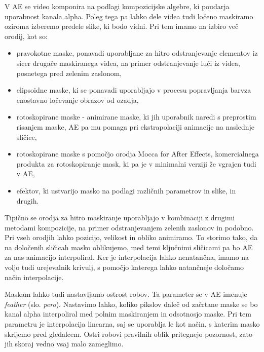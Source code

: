 \documentclass[a4paper, 12pt]{book}
\begin{document}
V AE se video komponira na podlagi kompozicijske algebre, ki poudarja uporabnost kanala alpha.
Poleg tega pa lahko dele videa tudi ločeno maskiramo oziroma izberemo predele slike, ki bodo vidni.
Pri tem imamo na izbiro več orodij, kot so:
\begin{itemize}
\item{pravokotne maske, ponavadi uporabljane za hitro odstranjevanje elementov iz sicer drugače maskiranega videa, na primer odstranjevanje luči iz videa, posnetega pred zelenim zaslonom,}
\item{elipsoidne maske, ki se ponavadi uporabljajo v procesu popravljanja barv\footnotemark za enostavno ločevanje obrazov od ozadja,}
\item{rotoskopirane maske - animirane maske, ki jih uporabnik naredi s preprostim risanjem maske, AE pa mu pomaga pri ekstrapolaciji animacije na naslednje sličice,}
\item{rotoskopirane maske s pomočjo orodja Mocca for After Effects, komercialnega produkta za rotoskopiranje mask, ki pa je v minimalni verziji že vgrajen tudi v AE,}
\item{efektov, ki ustvarijo masko na podlagi različnih parametrov in slike, in drugih.}
\end{itemize}

Tipično se orodja za hitro maskiranje uporabljajo v kombinaciji z drugimi metodami kompozicije, na primer odstranjevanjem zelenih zaslonov in podobno.
Pri vseh orodjih lahko pozicijo, velikost in obliko animiramo. 
To storimo tako, da na določenih sličicah masko oblikujemo, med temi ključnimi sličicami pa bo AE za nas animacijo interpoliral. 
Ker je interpolacija lahko nenatančna, imamo na voljo tudi urejevalnik krivulj, s pomočjo katerega lahko natančneje določamo način interpolacije.

Maskam lahko tudi nastavljamo ostrost robov.
Ta parameter se v AE imenuje {\it feather} (slo. {\it pero}).
Nastavimo lahko, koliko pikslov daleč od začrtane maske se bo kanal alpha interpoliral med polnim maskiranjem in odsotnosjo maske.
Pri tem parametru je interpolacija linearna, saj se uporablja le kot način, s katerim masko skrijemo pred gledalcem.
Ostri robovi pravilnih oblik pritegnejo pozornost, zato jih skoraj vedno vsaj malo zameglimo.

\end{document}
